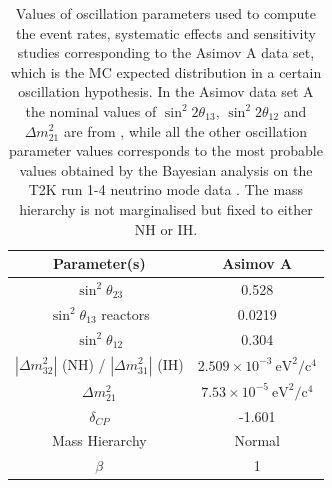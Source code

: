 \begin{table}[H]
\centering
\begin{tabular}{| c | c |}
\hline
Parameter(s) 											&	Asimov A 										\\
\hline
$\sin^{2}\theta_{23}$									&	0.528											\\
$\sin^{2} \theta_{13}$ reactors							&	0.0219										\\
$\sin^{2} \theta_{12}$									&	0.304											\\
$|\Delta m^{2}_{32}|$ (NH) / $|\Delta m^{2}_{31}|$ (IH)	&	$2.509 \times 10^{-3}~\mbox{eV}^2/\mbox{c}^4$	\\
$\Delta m^{2}_{21}$										&	$7.53 \times 10^{-5}~\mbox{eV}^2/\mbox{c}^4$	\\
$\delta_{CP}$											&	-1.601											\\
Mass Hierarchy											&	Normal											\\
$\beta$													&   1												\\  
\hline
\end{tabular}
\caption{
Values of oscillation parameters used to compute the event rates, systematic effects and sensitivity studies corresponding to the Asimov A data set, which is the MC expected distribution in a certain oscillation hypothesis.
In the Asimov data set A the nominal values of $\sin^2 2 \theta_{13}$, $\sin^2 2 \theta_{12}$
and $\Delta m^2_{21}$  are from \cite{pdg_2014}, while all the other oscillation parameter values corresponds to the most probable values obtained by the Bayesian analysis on the T2K run 1-4 neutrino mode data \cite{T2KLongPaper}. The mass hierarchy is not marginalised but fixed to either NH or IH.
}
\label{tab:osc_params_joint_asimovA}
\end{table}